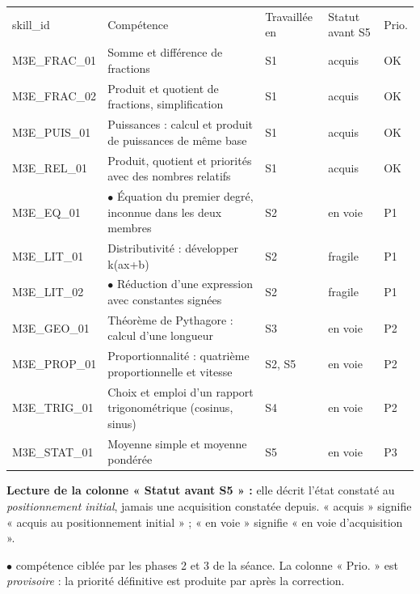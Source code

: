 \documentclass[10pt,a4paper]{article}
\begin{document}
\newpage{}
\par\noindent\begin{tabularx}{\linewidth}{>{\ttfamily\scriptsize}p{27mm} X >{\scriptsize}p{16mm} >{\scriptsize}p{20mm} >{\scriptsize\centering\arraybackslash}p{9mm}}
\rowcolor{Navy}\color{white}\scriptsize skill\_id & \color{white}Compétence & \color{white}Travaillée en & \color{white}Statut avant S5 & \color{white}Prio. \\
M3E\_FRAC\_01 & Somme et différence de fractions & S1 & acquis & OK \\
M3E\_FRAC\_02 & Produit et quotient de fractions, simplification & S1 & acquis & OK \\
M3E\_PUIS\_01 & Puissances : calcul et produit de puissances de même base & S1 & acquis & OK \\
M3E\_REL\_01 & Produit, quotient et priorités avec des nombres relatifs & S1 & acquis & OK \\
M3E\_EQ\_01 & $\bullet$ Équation du premier degré, inconnue dans les deux membres & S2 & en voie & P1 \\
M3E\_LIT\_01 & Distributivité : développer k(ax+b) & S2 & fragile & P1 \\
M3E\_LIT\_02 & $\bullet$ Réduction d'une expression avec constantes signées & S2 & fragile & P1 \\
M3E\_GEO\_01 & Théorème de Pythagore : calcul d'une longueur & S3 & en voie & P2 \\
M3E\_PROP\_01 & Proportionnalité : quatrième proportionnelle et vitesse & S2, S5 & en voie & P2 \\
M3E\_TRIG\_01 & Choix et emploi d'un rapport trigonométrique (cosinus, sinus) & S4 & en voie & P2 \\
M3E\_STAT\_01 & Moyenne simple et moyenne pondérée & S5 & en voie & P3 \\
\end{tabularx}
\par\vspace{1mm}\small\textbf{Lecture de la colonne « Statut avant S5 » :} elle décrit l'état constaté au \emph{positionnement initial}, jamais une acquisition constatée depuis. « acquis » signifie « acquis au positionnement initial » ; « en voie » signifie « en voie d'acquisition ».
\par\small$\bullet$ compétence ciblée par les phases 2 et 3 de la séance. La colonne « Prio. » est \emph{provisoire} : la priorité définitive est produite par  après la correction.
\end{document}

